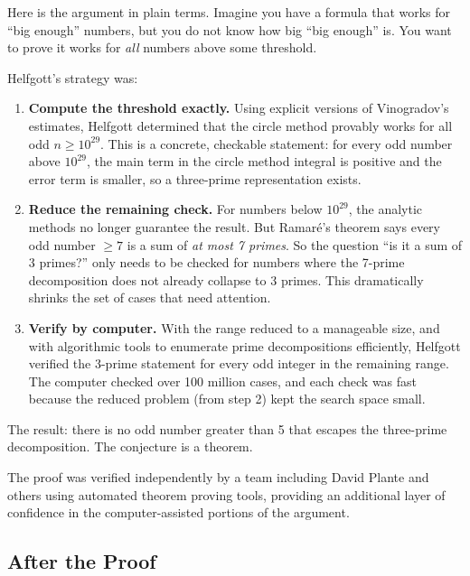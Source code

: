 Here is the argument in plain terms. Imagine you have a formula that works for ``big enough'' numbers, but you do not know how big ``big enough'' is. You want to prove it works for \emph{all} numbers above some threshold.

Helfgott's strategy was:

\begin{enumerate}
\item \textbf{Compute the threshold exactly.} Using explicit versions of Vinogradov's estimates, Helfgott determined that the circle method provably works for all odd $n \geq 10^{29}$. This is a concrete, checkable statement: for every odd number above $10^{29}$, the main term in the circle method integral is positive and the error term is smaller, so a three-prime representation exists.

\item \textbf{Reduce the remaining check.} For numbers below $10^{29}$, the analytic methods no longer guarantee the result. But Ramar\'e's theorem says every odd number $\geq 7$ is a sum of \emph{at most 7 primes}. So the question ``is it a sum of 3 primes?'' only needs to be checked for numbers where the 7-prime decomposition does not already collapse to 3 primes. This dramatically shrinks the set of cases that need attention.

\item \textbf{Verify by computer.} With the range reduced to a manageable size, and with algorithmic tools to enumerate prime decompositions efficiently, Helfgott verified the 3-prime statement for every odd integer in the remaining range. The computer checked over 100 million cases, and each check was fast because the reduced problem (from step 2) kept the search space small.
\end{enumerate}

The result: there is no odd number greater than 5 that escapes the three-prime decomposition. The conjecture is a theorem.

\begin{highlightbox}
The proof was verified independently by a team including David Plante and others using automated theorem proving tools, providing an additional layer of confidence in the computer-assisted portions of the argument.
\end{highlightbox}

\subsection{After the Proof}

